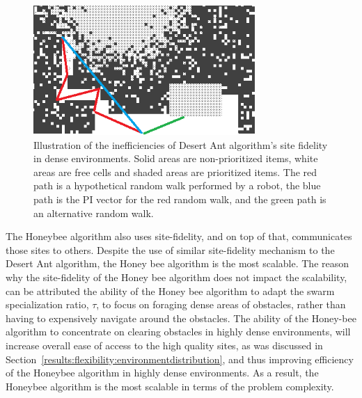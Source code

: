\begin{figure}[!htb]
\centering
\includegraphics[width=0.75\textwidth]{chapters/chapter6/figures/problem-scalability-desertant.png}
\caption{Illustration of the inefficiencies of Desert Ant algorithm's site fidelity in dense environments. Solid areas are non-prioritized items, white areas are free cells and shaded areas are prioritized items. The red path is a hypothetical random walk performed by a robot, the blue path is the PI vector for the red random walk, and the green path is an alternative random walk.}
\label{fig:desertantsitefidelity}
\end{figure}

The Honeybee algorithm also uses site-fidelity, and on top of that, communicates those sites to others. Despite the use of similar site-fidelity mechanism to the Desert Ant algorithm, the Honey bee algorithm is the most scalable. The reason why the site-fidelity of the Honey bee algorithm does not impact the scalability, can be attributed the ability of the Honey bee algorithm to adapt the swarm specialization ratio, $\tau$, to focus on foraging dense areas of obstacles, rather than having to expensively navigate around the obstacles. The ability of the Honey-bee algorithm to concentrate on clearing obstacles in highly dense environments, will increase overall ease of access to the high quality sites, as was discussed in Section~\ref{results:flexibility:environmentdistribution}, and thus improving efficiency of the Honeybee algorithm in highly dense environments. As a result, the Honeybee algorithm is the most scalable in terms of the problem complexity.


